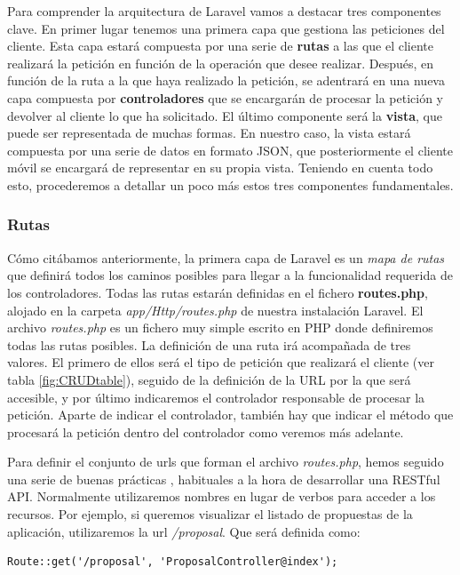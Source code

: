 Para comprender la arquitectura de Laravel vamos a destacar tres componentes clave. En primer lugar tenemos una primera capa que gestiona las peticiones del cliente. Esta capa estará compuesta por una serie de \textbf{rutas} a las que el cliente realizará la petición en función de la operación que desee realizar. Después, en función de la ruta a la que haya realizado la petición, se adentrará en una nueva capa compuesta por \textbf{controladores} que se encargarán de procesar la petición y devolver al cliente lo que ha solicitado. El último componente será la \textbf{vista}, que puede ser representada de muchas formas. En nuestro caso, la vista estará compuesta por una serie de datos en formato JSON, que posteriormente el cliente móvil se encargará de representar en su propia vista. Teniendo en cuenta todo esto, procederemos a detallar un poco más estos tres componentes fundamentales.

\subsubsection{Rutas}

Cómo citábamos anteriormente, la primera capa de Laravel es un \textit{mapa de rutas} que definirá todos los caminos posibles para llegar a la funcionalidad requerida de los controladores. Todas las rutas estarán definidas en el fichero \textbf{routes.php}, alojado en la carpeta \textit{app/Http/routes.php} de nuestra instalación Laravel. El archivo \textit{routes.php} es un fichero muy simple escrito en PHP donde definiremos todas las rutas posibles. La definición de una ruta irá acompañada de tres valores. El primero de ellos será el tipo de petición que realizará el cliente (ver tabla \ref{fig:CRUDtable}), seguido de la definición de la URL por la que será accesible, y por último indicaremos el controlador responsable de procesar la petición. Aparte de indicar el controlador, también hay que indicar el método que procesará la petición dentro del controlador como veremos más adelante.

Para definir el conjunto de urls que forman el archivo \textit{routes.php}, hemos seguido una serie de buenas prácticas \cite{ref:practicesRESTful_API}, habituales a la hora de desarrollar una RESTful API. Normalmente utilizaremos nombres en lugar de verbos para acceder a los recursos. Por ejemplo, si queremos visualizar el listado de propuestas de la aplicación, utilizaremos la url \textit{/proposal}. Que será definida como:	

\lstset{
   language        = php}
\begin{lstlisting}[frame=single]	
Route::get('/proposal', 'ProposalController@index');
\end{lstlisting}

